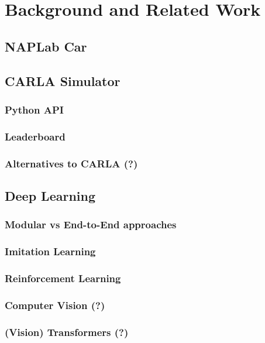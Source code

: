 \chapter{Background and Related Work}
\label{chap:background}

\section{NAPLab Car}


\section{CARLA Simulator}

\subsection{Python API}

\subsection{Leaderboard}

\subsection{Alternatives to CARLA (?)}


\section{Deep Learning}

\subsection{Modular vs End-to-End approaches}

\subsection{Imitation Learning}

\subsection{Reinforcement Learning}

\subsection{Computer Vision (?)}

\subsection{(Vision) Transformers (?)}



